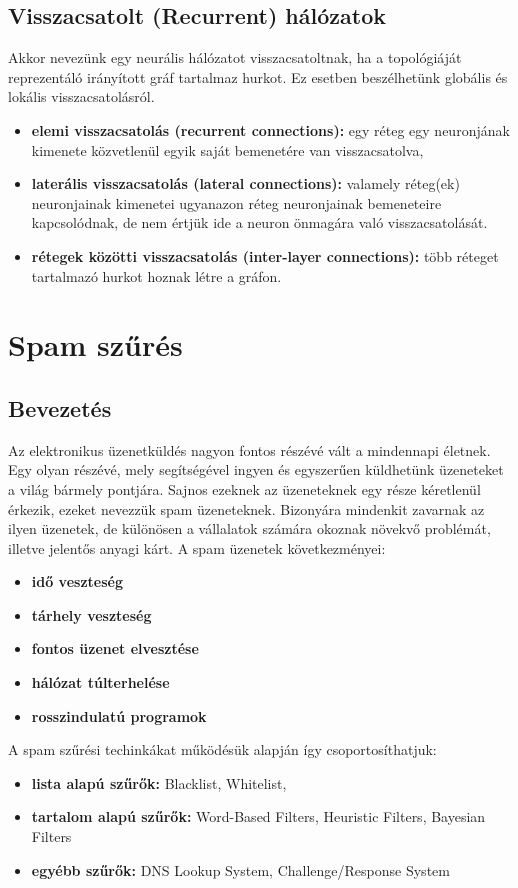 \documentclass[a4paper]{article}
\begin{document}
\subsection{Visszacsatolt (Recurrent) hálózatok}
Akkor nevezünk egy neurális hálózatot visszacsatoltnak, ha a topológiáját reprezentáló irányított gráf tartalmaz hurkot. Ez esetben beszélhetünk globális és lokális visszacsatolásról.

\begin{itemize}
    \item\textbf{elemi visszacsatolás (recurrent connections):} egy réteg egy neuronjának kimenete közvetlenül egyik saját bemenetére van visszacsatolva,
    \item\textbf{laterális visszacsatolás (lateral connections):} valamely réteg(ek) neuronjainak kimenetei ugyanazon réteg neuronjainak bemeneteire kapcsolódnak, de nem értjük ide a neuron önmagára való visszacsatolását.
    \item\textbf{rétegek közötti visszacsatolás (inter-layer connections):} több réteget tartalmazó hurkot hoznak létre a gráfon.
\end{itemize}

\section{Spam szűrés}
\subsection{Bevezetés}
Az elektronikus üzenetküldés nagyon fontos részévé vált a mindennapi életnek. Egy olyan részévé, mely segítségével ingyen és egyszerűen küldhetünk üzeneteket a világ bármely pontjára. Sajnos ezeknek az üzeneteknek egy része kéretlenül érkezik, ezeket nevezzük spam üzeneteknek. Bizonyára mindenkit zavarnak az ilyen üzenetek, de különösen a vállalatok számára okoznak növekvő problémát, illetve jelentős anyagi kárt. A spam üzenetek következményei:
\begin{itemize}
    \item\textbf{idő veszteség}
    \item\textbf{tárhely veszteség}
    \item\textbf{fontos üzenet elvesztése}
    \item\textbf{hálózat túlterhelése} 
    \item\textbf{rosszindulatú programok}  
\end{itemize}

A spam szűrési techinkákat működésük alapján így csoportosíthatjuk:
\begin{itemize}
    \item\textbf{lista alapú szűrők:} Blacklist, Whitelist,
    \item\textbf{tartalom alapú szűrők:} Word-Based Filters, Heuristic Filters, Bayesian Filters
    \item\textbf{egyébb szűrők:} DNS Lookup System, Challenge/Response System
\end{itemize}
\end{document}
